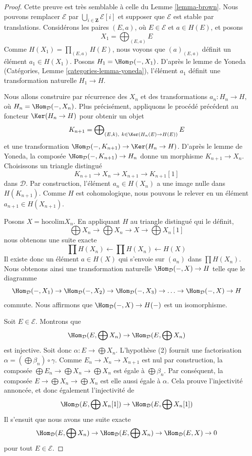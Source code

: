 \begin{proof}
Cette preuve est très semblable à celle du Lemme \ref{lemma-brown}.
Nous pouvons remplacer $\mathcal{E}$ par
$\bigcup_{i \in \mathbf{Z}} \mathcal{E}[i]$ et supposer que $\mathcal{E}$ est
stable par translations.
Considérons les paires $(E, a)$, où $E \in \mathcal{E}$ et $a \in H(E)$, et
posons
$$
X_1 = \bigoplus\nolimits_{(E, a)} E
$$
Comme $H(X_1) = \prod_{(E, a)} H(E)$, nous voyons que $(a)_{(E, a)}$ définit
un élément $a_1 \in H(X_1)$. Posons
$H_1 = \Hom_\mathcal{D}(- , X_1)$.
D'après le lemme de Yoneda
(Catégories, Lemme \ref{categories-lemma-yoneda}), l'élément $a_1$ définit une
transformation naturelle $H_1 \to H$.

\medskip\noindent
Nous allons construire par récurrence des $X_n$ et des transformations
$a_n : H_n \to H$, où $H_n = \Hom_\mathcal{D}(-, X_n)$.
Plus précisément, appliquons le procédé précédent au foncteur
$\Ker(H_n \to H)$ pour obtenir un objet
$$
K_{n + 1} = \bigoplus\nolimits_{(E, k),\ k \in \Ker(H_n(E) \to H(E))} E
$$
et une transformation
$\Hom_\mathcal{D}(-, K_{n + 1}) \to \Ker(H_n \to H)$.
D'après le lemme de Yoneda, la composée
$\Hom_\mathcal{D}(-, K_{n + 1}) \to H_n$ donne un morphisme
$K_{n + 1} \to X_n$. Choisissons un triangle distingué
$$
K_{n + 1} \to X_n \to X_{n + 1} \to K_{n + 1}[1]
$$
dans $\mathcal{D}$. Par construction, l'élément $a_n \in H(X_n)$ a une image
nulle dans $H(K_{n + 1})$. Comme $H$ est cohomologique, nous pouvons le relever
en un élément $a_{n + 1} \in H(X_{n + 1})$.

\medskip\noindent
Posons $X = \text{hocolim} X_n$. En appliquant $H$ au triangle distingué qui
le définit,
$$
\bigoplus X_n \to
\bigoplus X_n \to X \to
\bigoplus X_n[1]
$$
nous obtenons une suite exacte
$$
\prod H(X_n) \leftarrow
\prod H(X_n) \leftarrow
H(X)
$$
Il existe donc un élément $a \in H(X)$ qui s'envoie sur $(a_n)$ dans
$\prod H(X_n)$. Nous obtenons ainsi une transformation naturelle
$\Hom_\mathcal{D}(- , X) \to H$ telle que le diagramme
$$
\Hom_\mathcal{D}(-, X_1) \to
\Hom_\mathcal{D}(-, X_2) \to
\Hom_\mathcal{D}(-, X_3) \to \ldots \to
\Hom_\mathcal{D}(-, X) \to H
$$
commute. Nous affirmons que $\Hom_\mathcal{D}(-, X) \to H(-)$ est un
isomorphisme.

\medskip\noindent
Soit $E \in \mathcal{E}$. Montrons que
$$
\Hom_\mathcal{D}(E, \bigoplus X_n) \to  \Hom_\mathcal{D}(E, \bigoplus X_n)
$$
est injective. Soit donc $\alpha : E \to \bigoplus X_n$. L'hypothèse (2)
fournit une factorisation
$\alpha = (\bigoplus \beta_n) \circ \gamma$.
Comme $E_n \to X_n \to X_{n + 1}$ est nul par construction, la composée
$\bigoplus E_n \to \bigoplus X_n \to \bigoplus X_n$ est égale à
$\bigoplus \beta_n$. Par conséquent, la composée
$E \to \bigoplus X_n \to \bigoplus X_n$ est elle aussi égale à $\alpha$.
Cela prouve l'injectivité annoncée, et donc également l'injectivité de
$$
\Hom_\mathcal{D}(E, \bigoplus X_n[1]) \to \Hom_\mathcal{D}(E, \bigoplus X_n[1])
$$
Il s'ensuit que nous avons une suite exacte
$$
\Hom_\mathcal{D}(E, \bigoplus X_n) \to
\Hom_\mathcal{D}(E, \bigoplus X_n) \to
\Hom_\mathcal{D}(E, X) \to 0
$$
pour tout $E \in \mathcal{E}$.


\end{proof}
